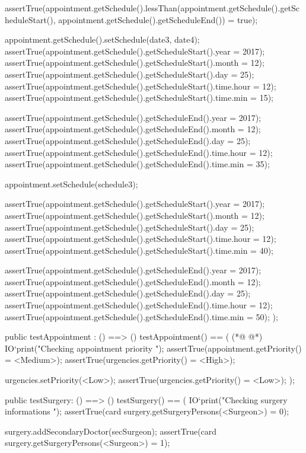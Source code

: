 \begin{vdmpp}[breaklines=true]
   assertTrue(appointment.getSchedule().lessThan(appointment.getSchedule().getScheduleStart(), appointment.getSchedule().getScheduleEnd()) = true);
   
   appointment.getSchedule().setSchedule(date3, date4);
   assertTrue(appointment.getSchedule().getScheduleStart().year = 2017);
   assertTrue(appointment.getSchedule().getScheduleStart().month = 12);
   assertTrue(appointment.getSchedule().getScheduleStart().day = 25);
   assertTrue(appointment.getSchedule().getScheduleStart().time.hour = 12);
   assertTrue(appointment.getSchedule().getScheduleStart().time.min = 15);
   
   assertTrue(appointment.getSchedule().getScheduleEnd().year = 2017);
   assertTrue(appointment.getSchedule().getScheduleEnd().month = 12);
   assertTrue(appointment.getSchedule().getScheduleEnd().day = 25);
   assertTrue(appointment.getSchedule().getScheduleEnd().time.hour = 12);
   assertTrue(appointment.getSchedule().getScheduleEnd().time.min = 35);
   
   appointment.setSchedule(schedule3);
   
   assertTrue(appointment.getSchedule().getScheduleStart().year = 2017);
   assertTrue(appointment.getSchedule().getScheduleStart().month = 12);
   assertTrue(appointment.getSchedule().getScheduleStart().day = 25);
   assertTrue(appointment.getSchedule().getScheduleStart().time.hour = 12);
   assertTrue(appointment.getSchedule().getScheduleStart().time.min = 40);
   
   assertTrue(appointment.getSchedule().getScheduleEnd().year = 2017);
   assertTrue(appointment.getSchedule().getScheduleEnd().month = 12);
   assertTrue(appointment.getSchedule().getScheduleEnd().day = 25);
   assertTrue(appointment.getSchedule().getScheduleEnd().time.hour = 12);
   assertTrue(appointment.getSchedule().getScheduleEnd().time.min = 50);
  );
  
 public testAppointment : () ==> ()
  testAppointment() == (
(*@
\label{testAppointment:174}
@*)
   IO`print("\n Checking appointment priority \n");
   assertTrue(appointment.getPriority() = <Medium>);
   assertTrue(urgencies.getPriority() = <High>);
   
   urgencies.setPriority(<Low>);
   assertTrue(urgencies.getPriority() = <Low>);
  );
  
 public testSurgery: () ==> ()
  testSurgery() == (
   IO`print("\n Checking surgery informations \n");
   assertTrue(card surgery.getSurgeryPersons(<Surgeon>) = 0);
   
   surgery.addSecondaryDoctor(secSurgeon);
   assertTrue(card surgery.getSurgeryPersons(<Surgeon>) = 1);
  

\end{vdmpp}
